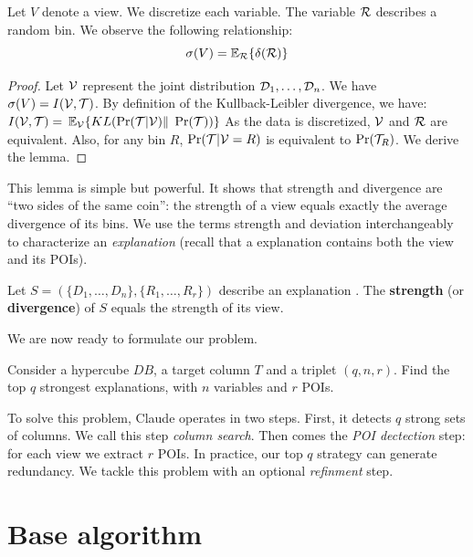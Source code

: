\begin{lemma}
Let $V$ denote a view. We discretize each variable. The variable $\mathcal{R}$
describes a random bin.  We observe the following relationship:
\[
    \sigma(V) = \mathbb{E}_{\mathcal{R}} \{ \delta(\mathcal{R}) \}
\]
\end{lemma}

\begin{proof}
Let $\mathcal{V}$ represent the joint distribution $\mathcal{D}_1, \ldots, \mathcal{D}_n$.
We have $\sigma(V) = I(\mathcal{V},\mathcal{T})$.
By definition of the Kullback-Leibler divergence, we have: 
$I(\mathcal{V},\mathcal{T}) = $ $\mathbb{E}_{\mathcal{V}} \{ KL( \Pr(\mathcal{T} | \mathcal{V}) \|$ $ \Pr(\mathcal{T}) ) \}$
As the data is discretized, $\mathcal{V}$ and $\mathcal{R}$ are equivalent. Also,
for any bin $R$, $\Pr(\mathcal{T} | \mathcal{V} = R)$ is equivalent to
$\Pr(\mathcal{T}_R)$. We derive the lemma.
\end{proof}


This lemma is simple but powerful. It shows that strength and divergence are
``two sides of the same coin'': the strength of a view equals exactly the
average divergence of its bins. We use the terms strength and
deviation interchangeably to characterize an \emph{explanation} (recall that a
explanation contains both the view and its POIs).

\begin{definition}
Let $S=(\{ D_1, \ldots, D_n\}, \{R_1, \ldots, R_r\})$ describe an explanation . The
\textbf{strength} (or \textbf{divergence}) of $S$ equals the strength
of its view.
\end{definition}

We are now ready to formulate our problem.

\begin{problem}
Consider a hypercube $DB$, a target column $T$ and a triplet $(q, n, r)$. Find
the top $q$ strongest explanations, with $n$ variables and $r$ POIs.
\end{problem}

To solve this problem, Claude operates in two steps. First, it detects $q$
strong sets of columns.  We call this step \emph{column search}.  Then comes
the \emph{POI dectection} step: for each view we extract $r$ POIs. In practice,
our top $q$ strategy can generate redundancy. We tackle this problem with an
optional \emph{refinment} step.


\section{Base algorithm}

